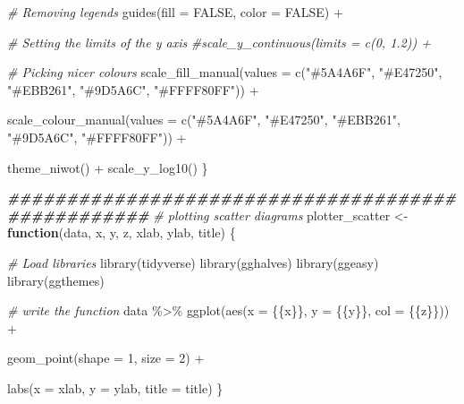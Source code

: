 \documentclass[a4paper,nobind]{templates/ociamthesis}
\newenvironment{Shaded}{\begin{snugshade}}{\end{snugshade}}
\newcommand{\AttributeTok}[1]{\textcolor[rgb]{0.77,0.63,0.00}{#1}}
\newcommand{\CommentTok}[1]{\textcolor[rgb]{0.56,0.35,0.01}{\textit{#1}}}
\newcommand{\ConstantTok}[1]{\textcolor[rgb]{0.00,0.00,0.00}{#1}}
\newcommand{\ControlFlowTok}[1]{\textcolor[rgb]{0.13,0.29,0.53}{\textbf{#1}}}
\newcommand{\DecValTok}[1]{\textcolor[rgb]{0.00,0.00,0.81}{#1}}
\newcommand{\DocumentationTok}[1]{\textcolor[rgb]{0.56,0.35,0.01}{\textbf{\textit{#1}}}}
\newcommand{\FunctionTok}[1]{\textcolor[rgb]{0.00,0.00,0.00}{#1}}
\newcommand{\NormalTok}[1]{#1}
\newcommand{\OtherTok}[1]{\textcolor[rgb]{0.56,0.35,0.01}{#1}}
\newcommand{\SpecialCharTok}[1]{\textcolor[rgb]{0.00,0.00,0.00}{#1}}
\newcommand{\StringTok}[1]{\textcolor[rgb]{0.31,0.60,0.02}{#1}}
\renewenvironment{Shaded}
{
  \vspace{10pt}%
  \begin{snugshade}%
}{%
  \end{snugshade}%
  \vspace{8pt}%
}
\begin{document}
\begin{Shaded}
\begin{Highlighting}[]
    \CommentTok{\# Removing legends}
    \FunctionTok{guides}\NormalTok{(}\AttributeTok{fill =} \ConstantTok{FALSE}\NormalTok{, }\AttributeTok{color =} \ConstantTok{FALSE}\NormalTok{) }\SpecialCharTok{+}
    
    \CommentTok{\# Setting the limits of the y axis}
    \CommentTok{\#scale\_y\_continuous(limits = c(0, 1.2)) +}
    
    \CommentTok{\# Picking nicer colours}
    \FunctionTok{scale\_fill\_manual}\NormalTok{(}\AttributeTok{values =} \FunctionTok{c}\NormalTok{(}\StringTok{"\#5A4A6F"}\NormalTok{, }\StringTok{"\#E47250"}\NormalTok{,  }\StringTok{"\#EBB261"}\NormalTok{, }\StringTok{"\#9D5A6C"}\NormalTok{, }\StringTok{"\#FFFF80FF"}\NormalTok{)) }\SpecialCharTok{+}
    
    \FunctionTok{scale\_colour\_manual}\NormalTok{(}\AttributeTok{values =} \FunctionTok{c}\NormalTok{(}\StringTok{"\#5A4A6F"}\NormalTok{, }\StringTok{"\#E47250"}\NormalTok{,  }\StringTok{"\#EBB261"}\NormalTok{, }\StringTok{"\#9D5A6C"}\NormalTok{, }\StringTok{"\#FFFF80FF"}\NormalTok{)) }\SpecialCharTok{+}
    
    \FunctionTok{theme\_niwot}\NormalTok{() }\SpecialCharTok{+} \FunctionTok{scale\_y\_log10}\NormalTok{()}
\NormalTok{\}}

\DocumentationTok{\#\#\#\#\#\#\#\#\#\#\#\#\#\#\#\#\#\#\#\#\#\#\#\#\#\#\#\#\#\#\#\#\#\#\#\#\#\#\#\#\#\#\#\#\#\#\#\#\#\#}
\CommentTok{\# plotting scatter diagrams }
\NormalTok{plotter\_scatter }\OtherTok{\textless{}{-}} \ControlFlowTok{function}\NormalTok{(data, x, y, z, }
\NormalTok{                            xlab, ylab, title) \{}
  
  \CommentTok{\# Load libraries}
  \FunctionTok{library}\NormalTok{(tidyverse)}
  \FunctionTok{library}\NormalTok{(gghalves)}
  \FunctionTok{library}\NormalTok{(ggeasy)}
  \FunctionTok{library}\NormalTok{(ggthemes)}
  
  \CommentTok{\# write the function}
\NormalTok{  data }\SpecialCharTok{\%\textgreater{}\%} \FunctionTok{ggplot}\NormalTok{(}\FunctionTok{aes}\NormalTok{(}\AttributeTok{x =}\NormalTok{ \{\{x\}\}, }\AttributeTok{y =}\NormalTok{ \{\{y\}\}, }\AttributeTok{col =}\NormalTok{ \{\{z\}\})) }\SpecialCharTok{+} 
    
    \FunctionTok{geom\_point}\NormalTok{(}\AttributeTok{shape =} \DecValTok{1}\NormalTok{, }\AttributeTok{size =} \DecValTok{2}\NormalTok{) }\SpecialCharTok{+} 
    
    \FunctionTok{labs}\NormalTok{(}\AttributeTok{x =}\NormalTok{ xlab, }\AttributeTok{y =}\NormalTok{ ylab, }\AttributeTok{title =}\NormalTok{ title)}
\NormalTok{\}}
\end{Highlighting}
\end{Shaded}
\end{document}
